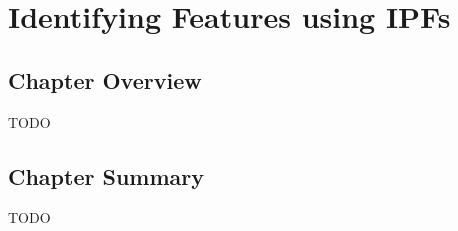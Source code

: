 \chapter{Identifying Features using IPFs}
\label{chap:featureid}

\section{Chapter Overview}

TODO

\section{Chapter Summary}

TODO